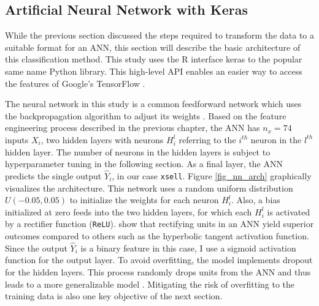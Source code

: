 \documentclass[12pt,a4paper]{article}
\newcommand{\pkg}[1]{{\normalfont\fontseries{b}\selectfont #1}}
\let\proglang=\textsf
\let\code=\texttt
\begin{document}
\subsection{Artificial Neural Network with Keras}

While the previous section discussed the steps required to transform the data to a suitable format for an ANN,
this section will describe the basic architecture of this classification method.
This study uses the \proglang{R} interface \pkg{keras} \citep{cholletInterfaceKeras2017} to the popular same name \proglang{Python} library.
This high-level API enables an easier way to access the features of Google's \pkg{TensorFlow} \citep{abadiTensorFlowLargeScaleMachine2015}.

The neural network in this study is a common feedforward network which uses the backpropagation algorithm to adjust its weights \citep{werbosBackpropagationTimeWhat1990}.
Based on the feature engineering process described in the previous chapter, the ANN has $n_x = 74$ inputs $X_i$, 
two hidden layers with neurons $H_i^l$ referring to the $i^{th}$ neuron in the $l^{th}$ hidden layer. 
The number of neurons in the hidden layers is subject to hyperparameter tuning in the following section.
As a final layer, the ANN predicts the single output $\hat{Y}_i$, in our case \code{xsell}.
Figure \ref{fig_nn_arch} graphically visualizes the architecture.
 \label{fig_nn_arch}
This network uses a random uniform distribution $U(-0.05, 0.05)$ to initialize the weights for each neuron $H_i^l$.
Also, a bias initialized at zero feeds into the two hidden layers, for which each $H_i^l$ is activated by a rectifier function (\code{ReLU}).
\cite{glorotDeepSparseRectifier2011} show that rectifying units in an ANN yield superior outcomes compared to others such as the hyperbolic tangent activation function. Since the output $\hat{Y}_i$ is a binary feature in this case, I use a sigmoid activation function for the output layer.
To avoid overfitting, the model implements dropout for the hidden layers.
This process randomly drops units from the ANN and thus leads to a more generalizable model \citep{srivastavaDropoutSimpleWay2014}.
Mitigating the risk of overfitting to the training data is also one key objective of the next section.
\end{document}

